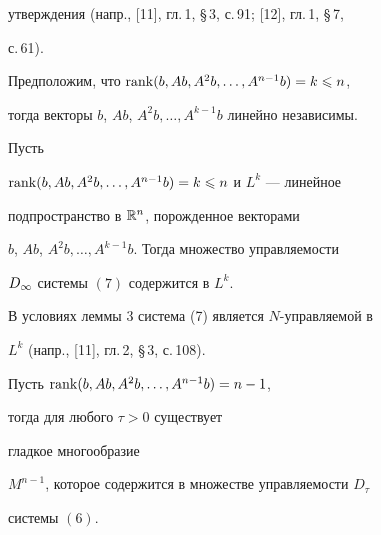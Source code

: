 утверждения (напр., [11], гл.\,1, \S\,3, с.\,91; [12], гл.\,1, \S\,7,


с.\,61).





\begin{lem}


Предположим, что $\operatorname{rank}(b,Ab,A^2b,\dotsc,A^{n-1}b)=k\leqslant n$,


тогда векторы $b$, $Ab$, $A^2b,\dotsc,A^{k-1}b$ линейно независимы.


\end{lem}





\begin{lem}


Пусть


$\operatorname{rank}(b,Ab,A^2b,\dotsc,A^{n-1}b)=k\leqslant n$ и $L^k$ --- линейное


подпространство в $\Bbb R^n$, порожденное векторами


$b$, $Ab$, $A^2b,\dotsc,A^{k-1}b$. Тогда множество управляемости


$D_{\infty}$ системы $(7)$ содержится в $L^k$.


\end{lem}





\begin{note}


В условиях леммы 3 система (7) является $N$-управляемой в


$L^k$ (напр., [11], гл.\,2, \S\,3, с.\,108).


\end{note}





\begin{lem}


Пусть $\operatorname{rank}(b,Ab,A^2b,\dotsc,A^{n-1}b)=n-1$,


тогда для любого $\tau>0$ существует


гладкое многообразие


$M^{n-1}$, которое содержится в множестве управляемости $D_{\tau}$


системы $(6)$.


\end{lem}






